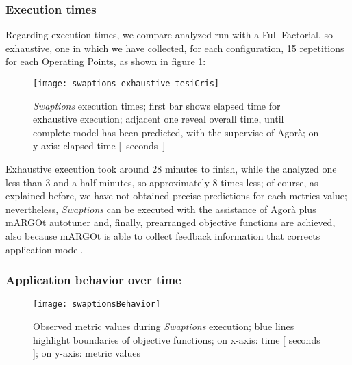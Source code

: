 \subsubsection{Execution times}

Regarding execution times, we compare analyzed run with a Full-Factorial, so exhaustive, one in which we have collected, for each configuration, 15 repetitions for each Operating Points, as shown in figure \ref{fig::sw::execT}:

\begin{figure}[H]

    \centering
    
    \texttt{[image: swaptions\_exhaustive\_tesiCris]}
    
    \caption{\textit{Swaptions} execution times; first bar shows elapsed time for exhaustive execution; adjacent one reveal overall time, until complete model has been predicted, with the supervise of Agorà; on y-axis: elapsed time \hbox{[ seconds ]}}
    
    \label{fig::sw::execT}
    
\end{figure}

Exhaustive execution took around 28 minutes to finish, while the analyzed one less than 3 and a half minutes, so approximately 8 times less; of course, as explained before, we have not obtained precise predictions for each metrics value; nevertheless, \textit{Swaptions} can be executed with the assistance of Agorà plus mARGOt autotuner and, finally, prearranged objective functions are achieved, also because mARGOt is able to collect feedback information that corrects application model.


\subsubsection{Application behavior over time}

\begin{figure}[H]

    \centering
    
    \texttt{[image: swaptionsBehavior]}
    
    \caption{Observed metric values during \textit{Swaptions} execution; blue lines highlight boundaries of objective functions; on x-axis: time [ seconds ]; on y-axis: metric values}
    
    \label{fig::sw::beh}
    
\end{figure}

